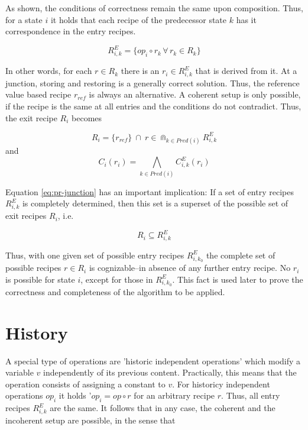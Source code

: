 \documentclass[12pt,a4paper]{scrartcl}
\begin{document}
As shown, the conditions of correctness remain the same upon composition. Thus,
for a state $i$ it holds that each recipe of the predecessor state $k$ has it
correspondence in the entry recipes.

\begin{equation} \label{eq:R-entry-junction}
    R^E_{i,k} = \{ op_i \circ r_k \,\forall\,r_k\in R_k \}
\end{equation}

In other words, for each $r\in R_k$ there is an $r_i\in R^E_{i,k}$ that is
derived from it.  At a junction, storing and restoring is a generally correct
solution. Thus, the reference value based recipe $r_{ref}$ is always an
alternative. A coherent setup is only possible, if the recipe is the same at
all entries and the conditions do not contradict. Thus, the exit recipe $R_i$
becomes

\begin{equation} \label{eq:pr-junction}
    R_i = \{ r_{ref} \} \
             \cap       \
          r\in\Cap_{k\in Pred(i)} R^E_{i,k} 
\end{equation}
and
\begin{equation} \label{eq:c-junction}
    C_i(r_i) = \bigwedge_{k\in Pred(i)} C^E_{i,k}(r_i)
\end{equation}

Equation \ref{eq:pr-junction} has an important implication: If a set of entry
recipes $R^E_{i,k}$ is completely determined, then this set is a superset of
the possible set of exit recipes $R_i$, i.e.

\begin{equation} \label{eq:pr-subset-junction}
    R_i \subseteq R^E_{i,k} 
\end{equation}

Thus, with one given set of possible entry recipes $R^E_{i,k_0}$ the complete
set of possible recipes $r\in R_i$ is cognizable--in absence of any further
entry recipe. No $r_i$ is possible for state $i$, except for those in
$R^E_{i,k_0}$. This fact is used later to prove the correctness and
completeness of the algorithm to be applied. 

\section{History}

A special type of operations are 'historic independent operations' which modify
a variable $v$ independently of its previous content. Practically, this means
that the operation consists of assigning a constant to $v$. For historicy
independent operations $op_i$ it holds '$op_i=op\circ r$ for an arbitrary recipe $r$. 
Thus, all entry recipes $R^E_{i,k}$ are the same. It follows that in any 
case, the coherent and the incoherent setup are possible, in the sense that 
\end{document}

